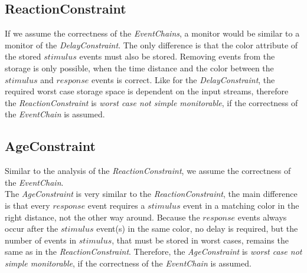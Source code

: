 \subsection{ReactionConstraint}
	If we assume the correctness of the \textit{EventChains}, a monitor would be similar to a monitor of the \textit{DelayConstraint}. The only difference is that the color attribute of the stored $stimulus$ events must also be stored. Removing events from the storage is only possible, when the time distance and the color between the $stimulus$ and $response$ events is correct.  Like for the \textit{DelayConstraint}, the required worst case storage space is dependent on the input streams, therefore the \textit{ReactionConstraint} is \textit{worst case not simple monitorable}, if the correctness of the \textit{EventChain} is assumed.

\subsection{AgeConstraint}
	Similar to the analysis of the \textit{ReactionConstraint}, we assume the correctness of the \textit{EventChain}.\\
	The \textit{AgeConstraint} is very similar to the \textit{ReactionConstraint}, the main difference is that every $response$ event requires a $stimulus$ event in a matching color in the right distance, not the other way around. Because the $response$ events always occur after the $stimulus$ event(s) in the same color, no delay is required, but the number of events in $stimulus$, that must be stored in worst cases, remains the same as in the \textit{ReactionConstraint}. Therefore, the \textit{AgeConstraint} is \textit{worst case not simple monitorable}, if the correctness of the \textit{EventChain} is assumed.
	
